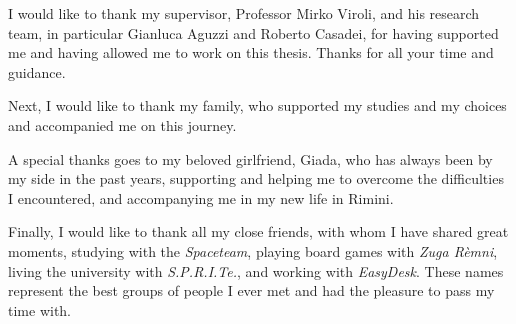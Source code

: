 \begin{acknowledgements} %
\noindent
I would like to thank my supervisor, Professor Mirko Viroli, and his research team, in particular Gianluca Aguzzi and Roberto Casadei, for having supported me and having allowed me to work on this thesis.
%
Thanks for all your time and guidance.

Next, I would like to thank my family, who supported my studies and my choices and accompanied me on this journey.

A special thanks goes to my beloved girlfriend, Giada, who has always been by my side in the past years, supporting and helping me to overcome the difficulties I encountered, and accompanying me in my new life in Rimini.

Finally, I would like to thank all my close friends, with whom I have shared great moments, studying with the \textit{Spaceteam}, playing board games with \textit{Zuga Rèmni}, living the university with \textit{S.P.R.I.Te.}, and working with \textit{EasyDesk}.
%
These names represent the best groups of people I ever met and had the pleasure to pass my time with.
\end{acknowledgements}
